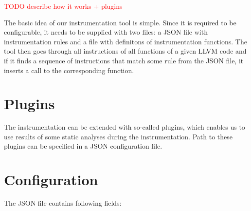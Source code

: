 \textcolor{red}{TODO describe how it works + plugins}

The basic idea of our instrumentation tool is simple. Since it is required to
be configurable, it needs to be supplied with two files: a JSON file with
instrumentation rules and a file with definitons of instrumentation functions.
The tool then goes through all instructions of all functions of a given LLVM
code and if it finds a sequence of instructions that match some rule from the
JSON file, it inserts a call to the corresponding function.

\section{Plugins}
The instrumentation can be extended with so-called plugins, which enables us to
use results of some static analyses during the instrumentation. Path to these
plugins can be specified in a JSON configuration file.

\section{Configuration}
The JSON file contains following fields:

